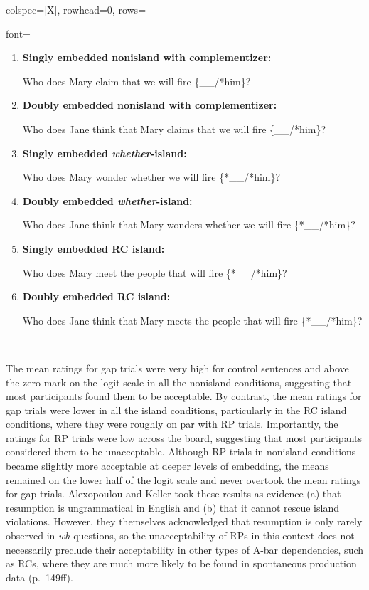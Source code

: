 \begin{longtblr}[caption={\textcite{alexopoulou.keller2007}: English acceptability judgment task}, label={tblr:alexopoulou}]{colspec={|X|}, rowhead=0, rows={font=\raggedright{}}}
\begin{varwidth}{\linewidth}
\begin{enumerate}[\bfseries (a),itemsep=5pt]
Who does Jane think Mary claims we will fire \{\_\_/*him\}?
\item \textbf{Singly embedded nonisland with complementizer:}\par\nobreak
Who does Mary claim that we will fire \{\_\_/*him\}?
\item \textbf{Doubly embedded  nonisland with complementizer:}\par\nobreak
Who does Jane think that Mary claims that we will fire \{\_\_/*him\}?
\item \textbf{Singly embedded \textit{whether}-island:}\par\nobreak
Who does Mary wonder whether we will fire \{*\_\_/*him\}?
\item \textbf{Doubly embedded \textit{whether}-island:}\par\nobreak
Who does Jane think that Mary wonders whether we will fire \{*\_\_/*him\}?
\item \textbf{Singly embedded RC island:}\par\nobreak
Who does Mary meet the people that will fire \{*\_\_/*him\}?
\item \textbf{Doubly embedded RC island:}\par\nobreak
Who does Jane think that Mary meets the people that will fire \{*\_\_/*him\}?
\end{enumerate}\end{varwidth}\vspace{5pt}\\\hline
\end{longtblr}

The mean ratings for gap trials were very high for control sentences and above the zero mark on the logit scale in all the nonisland conditions, suggesting that most participants found them to be acceptable. By contrast, the mean ratings for gap trials were lower in all the island conditions, particularly in the RC island conditions, where they were roughly on par with RP trials. Importantly, the ratings for RP trials were low across the board, suggesting that most participants considered them to be unacceptable. Although RP trials in nonisland conditions became slightly more acceptable at deeper levels of embedding, the means remained on the lower half of the logit scale and never overtook the mean ratings for gap trials. Alexopoulou and Keller took these results as evidence (a) that resumption is ungrammatical in English and (b) that it cannot rescue island violations. However, they themselves acknowledged that resumption is only rarely observed in \textit{wh}-questions, so the unacceptability of RPs in this context does not necessarily preclude their acceptability in other types of A-bar dependencies, such as RCs, where they are much more likely to be found in spontaneous production data (p.~149ff).

